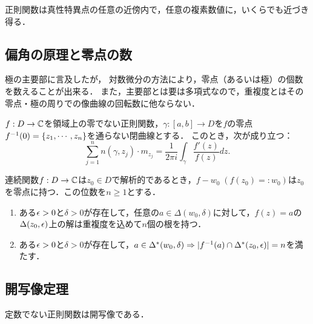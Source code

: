 \documentclass[uplatex, dvipdfmx]{jsreport}
\begin{document}
\begin{theorem}[Weierstrass]
    正則関数は真性特異点の任意の近傍内で，任意の複素数値に，いくらでも近づき得る．
\end{theorem}

\subsection{偏角の原理と零点の数}

\begin{tcolorbox}[colframe=ForestGreen, colback=ForestGreen!10!white,breakable,colbacktitle=ForestGreen!40!white,coltitle=black,fonttitle=\bfseries\sffamily,
title=]
    極の主要部に言及したが，
    対数微分の方法により，零点（あるいは極）の個数を数えることが出来る．
    また，主要部とは要は多項式なので，重複度とはその零点・極の周りでの像曲線の回転数に他ならない．
\end{tcolorbox}

\begin{theorem}[偏角の原理]
    $f:D\to\mathbb{C}$を領域上の零でない正則関数，$\gamma:[a,b]\to D$を$f$の零点$f^{-1}(0)=\left\{z_1,\cdots,z_n\right\}$を通らない閉曲線とする．
    このとき，次が成り立つ：
    \[\sum_{j=1}^nn(\gamma,z_j)\cdot m_{z_j}=\frac{1}{2\pi i}\int_\gamma\frac{f'(z)}{f(z)}dz.\]
\end{theorem}

\begin{corollary}[零点の近傍での対応]
    連続関数$f:D\to\mathbb{C}$は$z_0\in D$で解析的であるとき，$f-w_0\;(f(z_0)=:w_0)$は$z_0$を零点に持つ．この位数を$n\ge1$とする．
    \begin{enumerate}
        \item ある$\epsilon>0$と$\delta>0$が存在して，任意の$a\in\Delta(w_0,\delta)$に対して，$f(z)=a$の$\Delta(z_0,\epsilon)$上の解は重複度を込めて$n$個の根を持つ．
        \item ある$\epsilon>0$と$\delta>0$が存在して，$a\in\Delta^*(w_0,\delta)\Rightarrow\lvert f^{-1}(a)\cap\Delta^*(z_0,\epsilon)\rvert=n$を満たす．
    \end{enumerate}
\end{corollary}

\subsection{開写像定理}

\begin{corollary}
    定数でない正則関数は開写像である．
\end{corollary}
\end{document}
